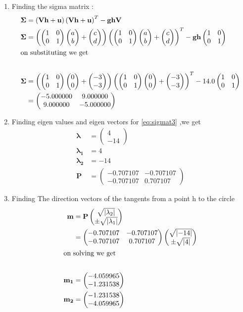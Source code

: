 \documentclass[11pt, a4paper]{article}
\newcommand{\myvec}[1]{\ensuremath{\begin{pmatrix}#1\end{pmatrix}}}
\let\vec\mathbf
\newcommand{\abs}[1]{\left| #1 \right|}
\providecommand{\brak}[1]{\ensuremath{\left(#1\right)}}
\providecommand{\abs}[1]{\left\vert#1\right\vert}
\begin{document}
\begin{enumerate}
\begin{enumerate}
\item Finding the sigma matrix : 
\begin{align}
	\vec{\Sigma} &= \brak{\vec{V}\vec{h}+\vec{u}}\brak{\vec{V}\vec{h}+\vec{u}}^T -\vec{gh}\vec{V}  \label{eq:sigmat}\\
	\vec{\Sigma} &= \brak{\myvec{1 &0 \\0 & 1}\myvec{a \\ b}+\myvec{c \\ d}} \brak{\myvec{1 &0 \\0 & 1}\myvec{a \\b}+\myvec{c \\ d}}^T - \vec{gh}\myvec{1 &0 \\ 0& 1}   \label{eq:sigmat2} \\
\intertext{on substituting we get  }   \nonumber \\ 
	\vec{\Sigma} &= \brak{\myvec{1 &0 \\ 0 &1}\myvec{0 \\ 0 }+\myvec{-3 \\  -3}} \brak{\myvec{1 &0 \\ 0&1}\myvec{0 \\ 0}+\myvec{-3 \\ -3}}^T - 14.0 \myvec{1 &0 \\ 0& 1 } \\
	&= \myvec{-5.000000  & 9.000000 \\ 9.000000 & -5.000000 } \label{eq:sigmat3}
\end{align}

\item  Finding eigen values and eigen vectors for \eqref{eq:sigmat3} ,we get 
	\begin{align}
		\vec{\lambda} &=\myvec{4\\-14} \\
		\vec{\lambda_1} &=4 \\
		\vec{\lambda_2} &=-14  \\
		\vec{P} &=\myvec{ -0.707107& -0.707107\\ -0.707107 & 0.707107} 
	\end{align}

\item Finding  The direction vectors of the tangents from a point h to the circle
\begin{align}
	\vec{m} &=\vec{P}\myvec{\sqrt{\abs{\lambda_2}}\\ \pm \sqrt{\abs{\lambda_1}}} \\
		&=\myvec{ -0.707107& -0.707107\\ -0.707107 & 0.707107}\myvec{\sqrt{\abs{-14}}\\ \pm \sqrt{\abs{4}}} \\
\intertext{on solving  we get  }   \nonumber \\ 
	\vec{m_1} &=\myvec{-4.059965 \\ -1.231538 } \\
	\vec{m_2} &=\myvec{-1.231538 \\ -4.059965 } 
\end{align}


\end{enumerate}
\end{enumerate}
\end{document}
